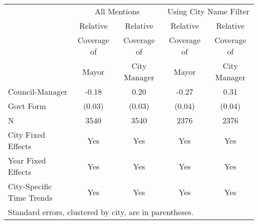 \documentclass[11pt]{article}
\begin{document}
\begin{table}[t] 
\centering 
\normalsize 
\begin{tabular}{lcccc} 
\toprule \toprule 
 & \multicolumn{2}{c}{All Mentions} & \multicolumn{2}{c}{Using City Name Filter} \\[2mm] 
 & Relative    & Relative     & Relative    & Relative     \\ 
 & Coverage of & Coverage of  & Coverage of & Coverage of  \\ 
 & Mayor       & City Manager & Mayor       & City Manager \\ 
\midrule 
 Council-Manager  &  -0.18  &  0.20  &  -0.27  &  0.31  \\ 
 \quad Govt Form  & (0.03) & (0.03) & (0.04) & (0.04) \\[2mm] 
 N                &  3540  &  3540  &  2376  &  2376  \\[2mm] 
 City Fixed Effects & Yes & Yes & Yes & Yes \\
 Year Fixed Effects & Yes & Yes & Yes & Yes \\
 City-Specific Time Trends & Yes & Yes & Yes & Yes \\
\bottomrule \bottomrule 
\multicolumn{5}{p{.80\textwidth}}{Standard errors, clustered by city, are in parentheses.} \\ 
\end{tabular} 
\end{table} 
\end{document}
